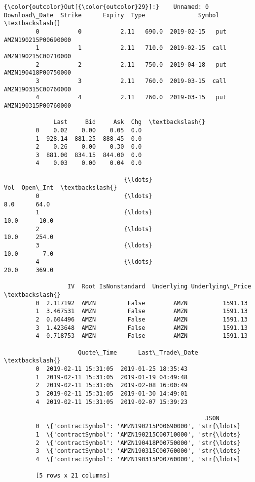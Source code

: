 \documentclass[11pt]{article}
\begin{document}
\begin{Verbatim}[commandchars=\\\{\}]
{\color{outcolor}Out[{\color{outcolor}29}]:}    Unnamed: 0  Download\_Date  Strike      Expiry  Type               Symbol  \textbackslash{}
         0           0           2.11   690.0  2019-02-15   put  AMZN190215P00690000   
         1           1           2.11   710.0  2019-02-15  call  AMZN190215C00710000   
         2           2           2.11   750.0  2019-04-18   put  AMZN190418P00750000   
         3           3           2.11   760.0  2019-03-15  call  AMZN190315C00760000   
         4           4           2.11   760.0  2019-03-15   put  AMZN190315P00760000   
         
              Last     Bid     Ask  Chg  \textbackslash{}
         0    0.02    0.00    0.05  0.0   
         1  928.14  881.25  888.45  0.0   
         2    0.26    0.00    0.30  0.0   
         3  881.00  834.15  844.00  0.0   
         4    0.03    0.00    0.04  0.0   
         
                                  {\ldots}                           Vol  Open\_Int  \textbackslash{}
         0                        {\ldots}                           8.0      64.0   
         1                        {\ldots}                          10.0      10.0   
         2                        {\ldots}                          10.0     254.0   
         3                        {\ldots}                          10.0       7.0   
         4                        {\ldots}                          20.0     369.0   
         
                  IV  Root IsNonstandard  Underlying Underlying\_Price  \textbackslash{}
         0  2.117192  AMZN         False        AMZN          1591.13   
         1  3.467531  AMZN         False        AMZN          1591.13   
         2  0.604496  AMZN         False        AMZN          1591.13   
         3  1.423648  AMZN         False        AMZN          1591.13   
         4  0.718753  AMZN         False        AMZN          1591.13   
         
                     Quote\_Time      Last\_Trade\_Date  \textbackslash{}
         0  2019-02-11 15:31:05  2019-01-25 18:35:43   
         1  2019-02-11 15:31:05  2019-01-19 04:49:48   
         2  2019-02-11 15:31:05  2019-02-08 16:00:49   
         3  2019-02-11 15:31:05  2019-01-30 14:49:01   
         4  2019-02-11 15:31:05  2019-02-07 15:39:23   
         
                                                         JSON  
         0  \{'contractSymbol': 'AMZN190215P00690000', 'str{\ldots}  
         1  \{'contractSymbol': 'AMZN190215C00710000', 'str{\ldots}  
         2  \{'contractSymbol': 'AMZN190418P00750000', 'str{\ldots}  
         3  \{'contractSymbol': 'AMZN190315C00760000', 'str{\ldots}  
         4  \{'contractSymbol': 'AMZN190315P00760000', 'str{\ldots}  
         
         [5 rows x 21 columns]
\end{Verbatim}
            
\end{document}
